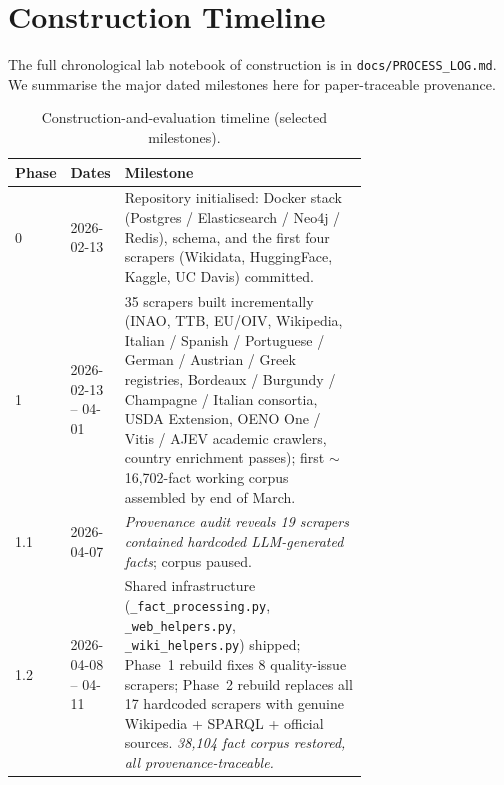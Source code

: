 \section{Construction Timeline}
\label{app:timeline}

The full chronological lab notebook of construction is in
\texttt{docs/PROCESS\_LOG.md}. We summarise the major dated milestones
here for paper-traceable provenance.

\begin{table}[h]
  \centering
  \footnotesize
  \caption{Construction-and-evaluation timeline (selected milestones).}
  \label{tab:timeline}
  \begin{tabular}{llp{0.7\linewidth}}
    \toprule
    Phase & Dates & Milestone \\
    \midrule
    0   & 2026-02-13         & Repository initialised: Docker stack
                               (Postgres / Elasticsearch / Neo4j / Redis), schema, and the
                               first four scrapers (Wikidata, HuggingFace, Kaggle,
                               UC Davis) committed. \\
    1   & 2026-02-13 -- 04-01 & 35 scrapers built incrementally
                               (INAO, TTB, EU/OIV, Wikipedia, Italian / Spanish /
                               Portuguese / German / Austrian / Greek registries,
                               Bordeaux / Burgundy / Champagne / Italian
                               consortia, USDA Extension, OENO One / Vitis /
                               AJEV academic crawlers, country enrichment passes);
                               first $\sim$16{,}702-fact working corpus
                               assembled by end of March. \\
    1.1 & 2026-04-07         & \emph{Provenance audit reveals 19 scrapers contained
                               hardcoded LLM-generated facts}; corpus paused. \\
    1.2 & 2026-04-08 -- 04-11 & Shared infrastructure
                               (\texttt{\_fact\_processing.py},
                               \texttt{\_web\_helpers.py},
                               \texttt{\_wiki\_helpers.py}) shipped;
                               Phase~1 rebuild fixes 8 quality-issue scrapers; Phase~2
                               rebuild replaces all 17 hardcoded scrapers with genuine
                               Wikipedia + SPARQL + official sources. \emph{38{,}104
                               fact corpus restored, all provenance-traceable.} \\

\end{tabular}
\end{table}
